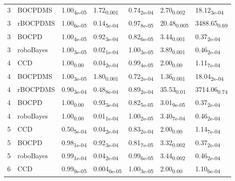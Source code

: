 \begin{table}[H]
\begin{tabular}{rllllll}
    3 & BOCPDMS & 1.00\textsubscript{4e-05} & 1.72\textsubscript{0.001} & 0.74\textsubscript{2e-04} & 2.70\textsubscript{0.002} & 18.12\textsubscript{3e-04} \\ 
    3 & rBOCPDMS & 1.00\textsubscript{6e-05} & 0.14\textsubscript{5e-04} & 0.97\textsubscript{8e-05} & 20.48\textsubscript{0.005} & 3488.65\textsubscript{0.69} \\ 
    3 & BOCPD & 1.00\textsubscript{4e-05} & 0.92\textsubscript{3e-04} & 0.82\textsubscript{6e-05} & 3.44\textsubscript{0.001} & 0.37\textsubscript{2e-04} \\ 
    3 & roboBayes & 1.00\textsubscript{3e-05} & 0.02\textsubscript{1e-04} & 1.00\textsubscript{3e-05} & 3.89\textsubscript{0.001} & 0.46\textsubscript{2e-04} \\ 
   \hline
  4 & CCD & 1.00\textsubscript{0.00} & 0.04\textsubscript{2e-04} & 0.99\textsubscript{4e-05} & 2.00\textsubscript{0.00} & 1.11\textsubscript{7e-04} \\ 
    4 & BOCPDMS & 1.00\textsubscript{3e-05} & 1.80\textsubscript{0.001} & 0.72\textsubscript{2e-04} & 1.36\textsubscript{0.001} & 18.04\textsubscript{2e-04} \\ 
    4 & rBOCPDMS & 0.90\textsubscript{3e-04} & 0.48\textsubscript{8e-04} & 0.89\textsubscript{2e-04} & 35.53\textsubscript{0.01} & 3714.06\textsubscript{0.74} \\ 
    4 & BOCPD & 1.00\textsubscript{0.00} & 0.93\textsubscript{3e-04} & 0.82\textsubscript{5e-05} & 3.01\textsubscript{9e-05} & 0.37\textsubscript{2e-04} \\ 
    4 & roboBayes & 1.00\textsubscript{0.00} & 0.01\textsubscript{1e-04} & 1.00\textsubscript{2e-05} & 3.40\textsubscript{7e-04} & 0.46\textsubscript{2e-04} \\ 
   \hline
  5 & CCD & 0.50\textsubscript{5e-04} & 0.04\textsubscript{2e-04} & 0.83\textsubscript{2e-04} & 2.00\textsubscript{0.00} & 1.14\textsubscript{7e-04} \\ 
    5 & BOCPD & 0.98\textsubscript{1e-04} & 0.92\textsubscript{3e-04} & 0.81\textsubscript{7e-05} & 3.32\textsubscript{0.002} & 0.37\textsubscript{2e-04} \\ 
    5 & roboBayes & 0.99\textsubscript{1e-04} & 0.04\textsubscript{2e-04} & 0.99\textsubscript{6e-05} & 3.44\textsubscript{0.002} & 0.46\textsubscript{2e-04} \\ 
   \hline
  6 & CCD & 0.99\textsubscript{9e-05} & 0.004\textsubscript{6e-05} & 1.00\textsubscript{3e-05} & 2.00\textsubscript{0.00} & 1.10\textsubscript{6e-04} \\ 

\end{tabular}
\end{table}
